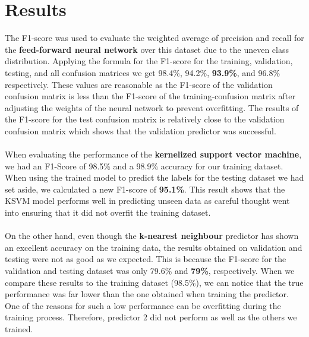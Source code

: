 \documentclass{article}
\newcommand{\enterProblemHeader}[1]{
\nobreak\extramarks{#1}{#1}\nobreak
\nobreak\extramarks{#1}{#1}\nobreak
}
\newcommand{\exitProblemHeader}[1]{
\nobreak\extramarks{#1}{#1}\nobreak
\nobreak\extramarks{#1}{}\nobreak
}
\newcounter{homeworkProblemCounter} %
\newcommand{\homeworkProblemName}{}
\newenvironment{homeworkProblem}[1][Problem \arabic{homeworkProblemCounter}]{ %
\stepcounter{homeworkProblemCounter} %
\renewcommand{\homeworkProblemName}{#1} %
\section{\homeworkProblemName} %
\enterProblemHeader{} %
}{
\exitProblemHeader{} %
}
\begin{document}
\begin{homeworkProblem}[Results]
The F1-score was used to evaluate the weighted average of precision and recall for the \textbf{feed-forward neural network} over this dataset due to the uneven class distribution. Applying the formula for the F1-score for the training, validation, testing, and all confusion matrices we get 98.4\%, 94.2\%, \textbf{93.9\%}, and 96.8\% respectively. These values are reasonable as the F1-score of the validation confusion matrix is less than the F1-score of the training-confusion matrix after adjusting the weights of the neural network to prevent overfitting. The results of the F1-score for the test confusion matrix is relatively close to the validation confusion matrix which shows that the validation predictor was successful.
\\
\\
When evaluating the performance of the \textbf{kernelized support vector machine}, we had an F1-Score of 98.5\% and a 98.9\% accuracy for our training dataset. When using the trained model to predict the labels for the testing dataset we had set aside, we calculated a new F1-score of \textbf{95.1\%}. This result shows that the KSVM model performs well in predicting unseen data as careful thought went into ensuring that it did not overfit the training dataset.
\\
\\
On the other hand, even though the \textbf{k-nearest neighbour} predictor has shown an excellent accuracy on the training data, the results obtained on validation and testing were not as good as we expected. This is because the F1-score for the validation and testing dataset was only 79.6\% and \textbf{79\%}, respectively. When we compare these results to the training dataset (98.5\%), we can notice that the true performance was far lower than the one obtained when training the predictor. One of the reasons for such a low performance can be overfitting during the training process. Therefore, predictor 2 did not perform as well as the others we trained. 



\end{homeworkProblem}
\clearpage

\newpage
\printbibliography
\end{document}
